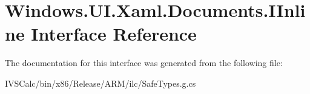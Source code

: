 \hypertarget{interface_windows_1_1_u_i_1_1_xaml_1_1_documents_1_1_i_inline}{}\section{Windows.\+U\+I.\+Xaml.\+Documents.\+I\+Inline Interface Reference}
\label{interface_windows_1_1_u_i_1_1_xaml_1_1_documents_1_1_i_inline}


The documentation for this interface was generated from the following file\+:\begin{DoxyCompactItemize}
\item 
I\+V\+S\+Calc/bin/x86/\+Release/\+A\+R\+M/ilc/Safe\+Types.\+g.\+cs\end{DoxyCompactItemize}
